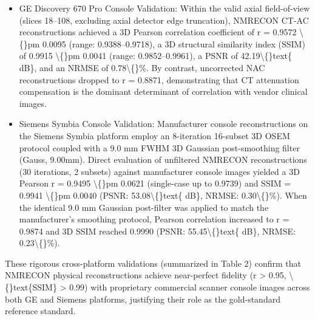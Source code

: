 \documentclass[11pt]{article}
\begin{document}
\begin{itemize}\item  GE Discovery 670 Pro Console Validation: Within the valid axial field-of-view (slices 18–108, excluding axial detector edge truncation), NMRECON CT-AC reconstructions achieved a 3D Pearson correlation coefficient of r = 0.9572 \textbackslash\{\}pm 0.0095 (range: 0.9388–0.9718), a 3D structural similarity index (SSIM) of 0.9915 \textbackslash\{\}pm 0.0041 (range: 0.9852–0.9961), a PSNR of 42.19\textbackslash\{\}text\{ dB\}, and an NRMSE of 0.78\textbackslash\{\}\%. By contrast, uncorrected NAC reconstructions dropped to r = 0.8871, demonstrating that CT attenuation compensation is the dominant determinant of correlation with vendor clinical images.\end{itemize}
\begin{itemize}\item  Siemens Symbia Console Validation: Manufacturer console reconstructions on the Siemens Symbia platform employ an 8-iteration 16-subset 3D OSEM protocol coupled with a 9.0 mm FWHM 3D Gaussian post-smoothing filter (Gauss, 9.00mm). Direct evaluation of unfiltered NMRECON reconstructions (30 iterations, 2 subsets) against manufacturer console images yielded a 3D Pearson r = 0.9495 \textbackslash\{\}pm 0.0621 (single-case up to 0.9739) and SSIM = 0.9941 \textbackslash\{\}pm 0.0040 (PSNR: 53.08\textbackslash\{\}text\{ dB\}, NRMSE: 0.30\textbackslash\{\}\%). When the identical 9.0 mm Gaussian post-filter was applied to match the manufacturer's smoothing protocol, Pearson correlation increased to r = 0.9874 and 3D SSIM reached 0.9990 (PSNR: 55.45\textbackslash\{\}text\{ dB\}, NRMSE: 0.23\textbackslash\{\}\%).\end{itemize}
These rigorous cross-platform validations (summarized in Table 2) confirm that NMRECON physical reconstructions achieve near-perfect fidelity (r > 0.95, \textbackslash\{\}text\{SSIM\} > 0.99) with proprietary commercial scanner console images across both GE and Siemens platforms, justifying their role as the gold-standard reference standard.\par
\end{document}
